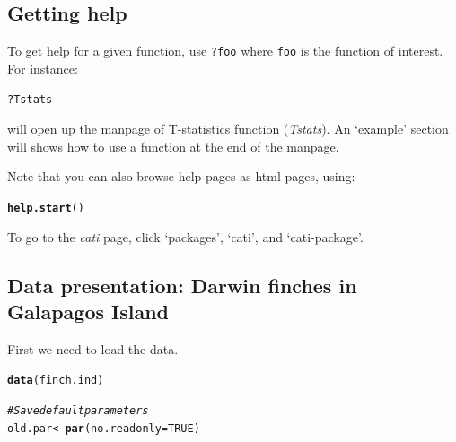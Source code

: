 \documentclass[12pt]{article}\usepackage[]{graphicx}\usepackage[]{color}
\makeatletter
\newcommand{\hlnum}[1]{\textcolor[rgb]{0.686,0.059,0.569}{#1}}%
\newcommand{\hlcom}[1]{\textcolor[rgb]{0.678,0.584,0.686}{\textit{#1}}}%
\newcommand{\hlopt}[1]{\textcolor[rgb]{0,0,0}{#1}}%
\newcommand{\hlstd}[1]{\textcolor[rgb]{0.345,0.345,0.345}{#1}}%
\newcommand{\hlkwb}[1]{\textcolor[rgb]{0.69,0.353,0.396}{#1}}%
\newcommand{\hlkwc}[1]{\textcolor[rgb]{0.333,0.667,0.333}{#1}}%
\newcommand{\hlkwd}[1]{\textcolor[rgb]{0.737,0.353,0.396}{\textbf{#1}}}%
\newenvironment{kframe}{%
 \def\at@end@of@kframe{}%
 \ifinner\ifhmode%
  \def\at@end@of@kframe{\end{minipage}}%
  \begin{minipage}{\columnwidth}%
 \fi\fi%
 \def\FrameCommand##1{\hskip\@totalleftmargin \hskip-\fboxsep
 \colorbox{shadecolor}{##1}\hskip-\fboxsep
     \hskip-\linewidth \hskip-\@totalleftmargin \hskip\columnwidth}%
 \MakeFramed {\advance\hsize-\width
   \@totalleftmargin\z@ \linewidth\hsize
   \@setminipage}}%
 {\par\unskip\endMakeFramed%
 \at@end@of@kframe}
\newenvironment{knitrout}{}{} %
\makeatother
\begin{document}
\subsection{Getting help}

To get help for a given function, use \texttt{?foo} where \texttt{foo} is the
function of interest.
For instance:

\begin{knitrout}
\color{fgcolor}\begin{kframe}
\begin{alltt}
\hlopt{?}\hlstd{Tstats}
\end{alltt}
\end{kframe}
\end{knitrout}

will open up the manpage of T-statistics function (\textit{Tstats}).
An `example' section will shows how to use a function at the end of the manpage. 

Note that you can also browse help pages as html pages, using:
\begin{knitrout}
\color{fgcolor}\begin{kframe}
\begin{alltt}
\hlkwd{help.start}\hlstd{()}
\end{alltt}
\end{kframe}
\end{knitrout}
To go to the \textit{cati} page, click `packages', `cati', and
`cati-package'.

\subsection{Data presentation: Darwin finches in Galapagos Island}

First we need to load the data.
\begin{knitrout}
\color{fgcolor}\begin{kframe}
\begin{alltt}
\hlkwd{data}\hlstd{(finch.ind)}

\hlcom{#Save default parameters}
\hlstd{old.par}\hlkwb{<-}\hlkwd{par}\hlstd{(}\hlkwc{no.readonly} \hlstd{=} \hlnum{TRUE}\hlstd{)}
\end{alltt}
\end{kframe}
\end{knitrout}
\end{document}
